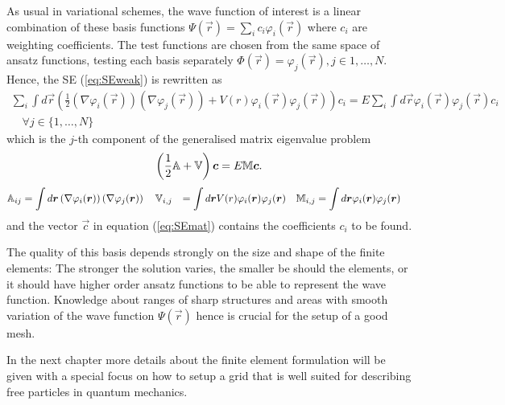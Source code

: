 As usual in variational schemes, the wave function of interest is a linear combination of these basis functions $\Psi(\vec{r})=\sum_i c_i \varphi_i(\vec{r})$ where $c_i$ are weighting coefficients.
The test functions are chosen from the same space of ansatz functions, testing each basis separately $\Phi(\vec{r})=\varphi_j(\vec{r}), j\in {1,\hdots, N}$.
Hence, the SE (\ref{eq:SEweak}) is rewritten as
\begin{multline}
     \sum_i \int d  \vec{r} \left(\frac 12 \left(\nabla\varphi_i(\vec{r})\right) \left(\nabla\varphi_j(\vec{r})\right) +
                             V(r) \varphi_i(\vec{r}) \varphi_j(\vec{r}) \right) c_i =
               E \sum_i \int d \vec{r} \varphi_i(\vec{r}) \varphi_j(\vec{r}) c_i \\
                      \quad \forall j \in \{1,\hdots ,N\}
\end{multline}
which is the $j$-th component of the generalised matrix eigenvalue problem
\begin{equation}\label{eq:SEmat}
\left(\frac 12 \mathbb{A} +\mathbb{V}\right)\bm{c} =E\mathbb{M}\bm{c}. 
\end{equation}
\begin{align} \label{eq:FEMmatrix}
      \mathbb{A}_{ij} &=\int d \bm{r} \left(\nabla\varphi_i(\bm{r})\right) \left(\nabla\varphi_j(\bm{r})\right) \quad
      \mathbb{V}_{i,j}&=\int d \bm{r} V(r) \varphi_i(\bm{r}) \varphi_j(\bm{r}) \quad
      \mathbb{M}_{i,j}&=\int d \bm{r} \varphi_i(\bm{r}) \varphi_j(\bm{r})
\end{align}
and the vector $\vec{c}$ in equation (\ref{eq:SEmat}) contains the coefficients $c_i$ to be found.

The quality of this basis depends strongly on the size and shape of the finite elements:
The stronger the solution varies, the smaller be should the elements, or it should have higher order ansatz functions to be able to represent the wave function.
Knowledge about ranges of sharp structures and areas with smooth variation of the wave function $\Psi(\vec{r})$ hence is crucial for the setup of a good mesh.

In the next chapter more details about the finite element formulation will be given with a special focus on how to setup a grid that is well suited for describing free particles in quantum mechanics.


